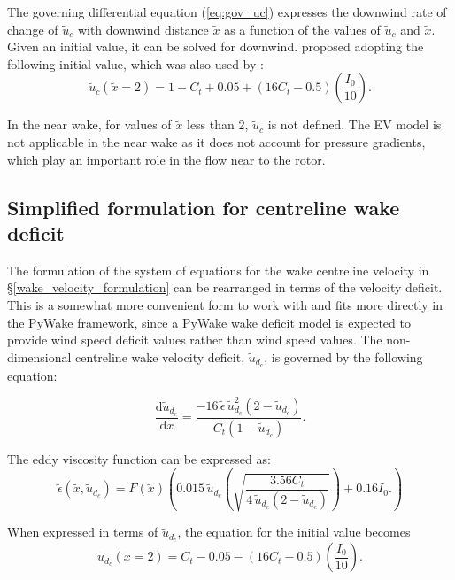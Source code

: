 \documentclass[11pt,a4paper]{article}
\begin{document}
The governing differential equation (\ref{eq:gov_uc}) expresses the downwind rate of change of $\tilde{u}_{c}$ with downwind distance $\tilde{x}$ as a function of the values of $\tilde{u}_{c}$ and $\tilde{x}$. Given an initial value, it can be solved for downwind. \textcite{Ainslie_1988} proposed adopting the following initial value, which was also used by \textcite{Anderson_2011}:
\begin{equation}\label{eq:initial_uc}
\tilde{u}_{c} (\tilde{x} = 2) = 1 - C_{t} + 0.05 + (16 C_{t} - 0.5) \left( \frac{I_{0}}{10} \right).
\end{equation}

In the near wake, for values of $\tilde{x}$ less than 2, $\tilde{u}_{c}$ is not defined. The EV model is not applicable in the near wake as it does not account for pressure gradients, which play an important role in the flow near to the rotor.

\subsection{Simplified formulation for centreline wake deficit}\label{wake_deficit_formulation}

The formulation of the system of equations for the wake centreline velocity in §\ref{wake_velocity_formulation} can be rearranged in terms of the velocity deficit. This is a somewhat more convenient form to work with and fits more directly in the PyWake framework, since a PyWake wake deficit model is expected to provide wind speed deficit values rather than wind speed values. The non-dimensional centreline wake velocity deficit, $\tilde{u}_{d_{c}}$, is governed by the following equation:

\begin{equation}\label{eq:gov_ud}
\frac{\textrm{d}\tilde{u}_{d_{c}}}{\textrm{d}\tilde{x}} =
  \frac{-16 \, \tilde{\epsilon} \, \tilde{u}_{d_{c}}^{2} \left( 2 - \tilde{u}_{d_{c}} \right)}{C_{t} \left( 1 - \tilde{u}_{d_{c}} \right)}.
\end{equation}

The eddy viscosity function can be expressed as:
\begin{equation}\label{eq:epsilon_ud}
\tilde{\epsilon} (\tilde{x}, \tilde{u}_{d_{c}}) =
  F(\tilde{x}) \left(
    0.015 \, \tilde{u}_{d_{c}} \left( \sqrt{\frac{3.56 C_{t}}{4 \, \tilde{u}_{d_{c}} \left( 2 - \tilde{u}_{d_{c}} \right)}} \right) + 0.16 I_{0}.
  \right)
\end{equation}

When expressed in terms of $\tilde{u}_{d_{c}}$, the equation for the initial value becomes
\begin{equation}\label{eq:initial_ud}
\tilde{u}_{d_{c}} (\tilde{x} = 2) = C_{t} - 0.05 - (16 C_{t} - 0.5) \left( \frac{I_{0}}{10} \right).
\end{equation}
\end{document}
